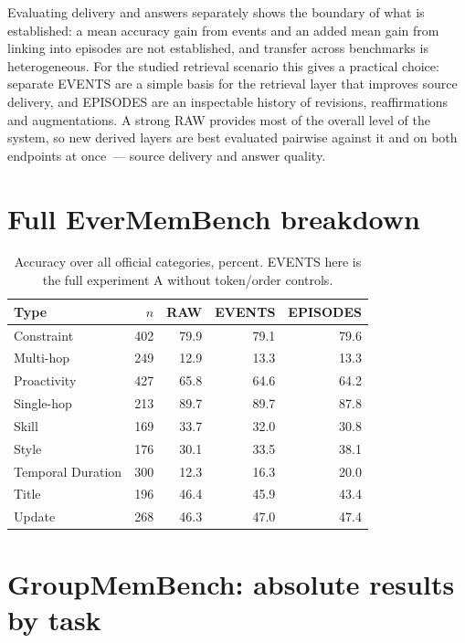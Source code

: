 \documentclass[11pt,a4paper]{article}
\newcommand{\raw}{RAW}
\newcommand{\events}{EVENTS}
\newcommand{\episodes}{EPISODES}
\begin{document}
Evaluating delivery and answers separately shows the boundary of what is established:
a mean accuracy gain from events and an added mean gain from linking into episodes are
not established, and transfer across benchmarks is heterogeneous. For the studied
retrieval scenario this gives a practical choice: separate \events{} are a simple basis
for the retrieval layer that improves source delivery, and \episodes{} are an
inspectable history of revisions, reaffirmations and augmentations. A strong \raw{}
provides most of the overall level of the system, so new derived layers are best
evaluated pairwise against it and on both endpoints at once~--- source delivery and
answer quality.

\FloatBarrier
\begingroup
\small


\endgroup
\clearpage
\appendix

\section{Full EverMemBench breakdown}

\begin{table}[ht]
\centering\small
\begin{tabular}{lrrrr}
\toprule
Type & $n$ & RAW & EVENTS & EPISODES\\
\midrule
Constraint & 402 & 79.9 & 79.1 & 79.6\\
Multi-hop & 249 & 12.9 & 13.3 & 13.3\\
Proactivity & 427 & 65.8 & 64.6 & 64.2\\
Single-hop & 213 & 89.7 & 89.7 & 87.8\\
Skill & 169 & 33.7 & 32.0 & 30.8\\
Style & 176 & 30.1 & 33.5 & 38.1\\
Temporal Duration & 300 & 12.3 & 16.3 & 20.0\\
Title & 196 & 46.4 & 45.9 & 43.4\\
Update & 268 & 46.3 & 47.0 & 47.4\\
\bottomrule
\end{tabular}
\caption{Accuracy over all official categories, percent. EVENTS here is the full
experiment A without token/order controls.}
\label{tab:ever-slices}
\end{table}

\section{GroupMemBench: absolute results by task}
\label{app:group-external}
\end{document}
